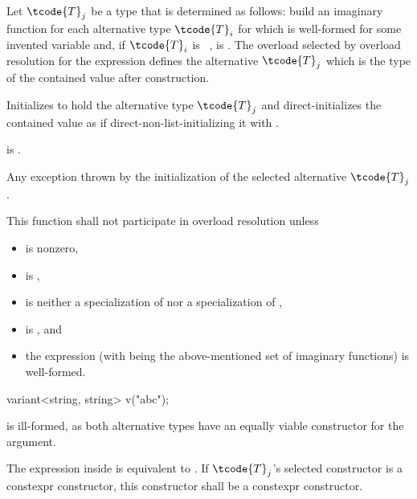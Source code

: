 \begin{itemdescr}
\pnum
Let $\tcode{T}_j$ be a type that is determined as follows:
build an imaginary function 
for each alternative type $\tcode{T}_i$
for which  
is well-formed for some invented variable  and,
if $\tcode{T}_i$ is \cv~,  is .
The overload  selected by overload
resolution for the expression  defines
the alternative $\tcode{T}_j$ which is the type of the contained value after
construction.

\pnum
\effects
Initializes  to hold the alternative type $\tcode{T}_j$ and
direct-initializes the contained value as if direct-non-list-initializing it
with .

\pnum
\ensures
{} is .

\pnum
\throws
Any exception thrown by the initialization of the selected alternative $\tcode{T}_j$.

\pnum
\remarks
This function shall not participate in overload resolution unless
\begin{itemize}
\item
   is nonzero,

\item
   is ,

\item
   is neither a specialization
  of  nor a specialization
  of ,

\item
   is , and

\item
  the expression \brk{}
  (with  being the above-mentioned set of
  imaginary functions) is well-formed.
\end{itemize}

\pnum
\begin{note}
\begin{codeblock}
variant<string, string> v("abc");
\end{codeblock}
is ill-formed, as both alternative types have an equally viable constructor
for the argument.
\end{note}

\pnum
The expression inside  is equivalent to
.
If $\tcode{T}_j$'s selected constructor is a constexpr constructor,
this constructor shall be a constexpr constructor.
\end{itemdescr}

